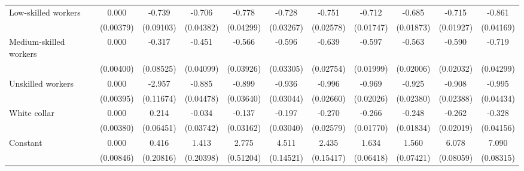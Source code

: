 {\begin{tabular}{l*{10}{c}}
Low-skilled workers &       0.000         &      -0.739\sym{***}&      -0.706\sym{***}&      -0.778\sym{***}&      -0.728\sym{***}&      -0.751\sym{***}&      -0.712\sym{***}&      -0.685\sym{***}&      -0.715\sym{***}&      -0.861\sym{***}\\
                    &   (0.00379)         &   (0.09103)         &   (0.04382)         &   (0.04299)         &   (0.03267)         &   (0.02578)         &   (0.01747)         &   (0.01873)         &   (0.01927)         &   (0.04169)         \\
Medium-skilled workers&       0.000         &      -0.317\sym{***}&      -0.451\sym{***}&      -0.566\sym{***}&      -0.596\sym{***}&      -0.639\sym{***}&      -0.597\sym{***}&      -0.563\sym{***}&      -0.590\sym{***}&      -0.719\sym{***}\\
                    &   (0.00400)         &   (0.08525)         &   (0.04099)         &   (0.03926)         &   (0.03305)         &   (0.02754)         &   (0.01999)         &   (0.02006)         &   (0.02032)         &   (0.04299)         \\
Unskilled workers   &       0.000         &      -2.957\sym{***}&      -0.885\sym{***}&      -0.899\sym{***}&      -0.936\sym{***}&      -0.996\sym{***}&      -0.969\sym{***}&      -0.925\sym{***}&      -0.908\sym{***}&      -0.995\sym{***}\\
                    &   (0.00395)         &   (0.11674)         &   (0.04478)         &   (0.03640)         &   (0.03044)         &   (0.02660)         &   (0.02026)         &   (0.02380)         &   (0.02388)         &   (0.04434)         \\
White collar        &       0.000         &       0.214\sym{***}&      -0.034         &      -0.137\sym{***}&      -0.197\sym{***}&      -0.270\sym{***}&      -0.266\sym{***}&      -0.248\sym{***}&      -0.262\sym{***}&      -0.328\sym{***}\\
                    &   (0.00380)         &   (0.06451)         &   (0.03742)         &   (0.03162)         &   (0.03040)         &   (0.02579)         &   (0.01770)         &   (0.01834)         &   (0.02019)         &   (0.04156)         \\
Constant            &       0.000         &       0.416\sym{*}  &       1.413\sym{***}&       2.775\sym{***}&       4.511\sym{***}&       2.435\sym{***}&       1.634\sym{***}&       1.560\sym{***}&       6.078\sym{***}&       7.090\sym{***}\\
                    &   (0.00846)         &   (0.20816)         &   (0.20398)         &   (0.51204)         &   (0.14521)         &   (0.15417)         &   (0.06418)         &   (0.07421)         &   (0.08059)         &   (0.08315)         \\

\end{tabular}}
